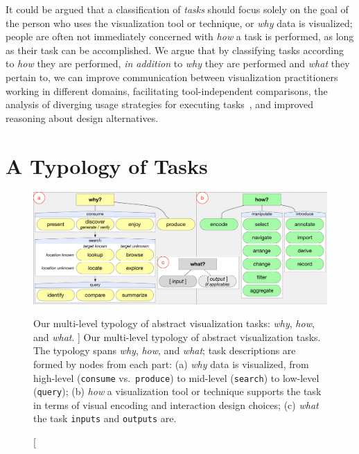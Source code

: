 It could be argued that a classification of {\it tasks} should focus solely on the goal of the person who uses the visualization tool or technique, or {\it why} data is visualized; people are often not immediately concerned with {\it how} a task is performed, as long as their task can be accomplished.
We argue that by classifying tasks according to {\it how} they are performed, {\it in addition} to {\it why} they are performed and {\it what} they pertain to, we can improve communication between visualization practitioners working in different domains, facilitating tool-independent comparisons, the analysis of diverging usage strategies for executing tasks~\cite{Vicente1999,Ziemkiewicz2012}, and improved reasoning about design alternatives.


\section{A Typology of Tasks}
\label{typology:typology}




\begin{figure}
    \centering
    \includegraphics[width=\textwidth]{figures/typology.pdf}
    \caption
    [
        Our multi-level typology of abstract visualization tasks: \textsl{why}, \textsl{how}, and \textsl{what}.
    ]
    {
        Our multi-level typology of abstract visualization tasks.
        The typology spans \textsl{why}, \textsl{how}, and \textsl{what}; task descriptions are formed by nodes from each part:
        (a) \textsl{why} data is visualized, from high-level ({\tt consume} vs.~{\tt produce}) to mid-level ({\tt search}) to low-level ({\tt query});
        (b) \textsl{how} a visualization tool or technique supports the task in terms of visual encoding and interaction design choices;
        (c) \textsl{what} the task {\tt inputs} and {\tt outputs} are.
    }
    \label{typology:fig:typology}
\end{figure}

